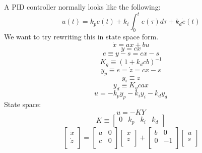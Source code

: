 \documentclass[10pt,letterpaper]{article}
\title{\doctitle}
\author{Garrett Wilson}
\begin{document}
\maketitle
A PID controller normally looks like the following:
\begin{equation}
u(t) = k_p e(t) + k_i \int_{0}^{t} e(\tau) d\tau + k_d \dot{e}(t)
\end{equation}
We want to try rewriting this in state space form.
\begin{equation}
\dot{x} = ax+bu
\end{equation}
\begin{equation}
y = cx
\end{equation}
\begin{equation}
e \equiv y - s = cx - s
\end{equation}
\begin{equation}
K_g \equiv ( 1 + k_d c b )^{-1}
\end{equation}
\begin{equation} \label{eq:y_p}
y_p \equiv e = \dot{z} = cx - s
\end{equation}
\begin{equation} \label{eq:y_i}
y_i \equiv z
\end{equation}
\begin{equation} \label{eq:y_d}
y_d \equiv K_g c a x
\end{equation}
\begin{equation} \label{eq:u}
u = -k_p y_p -k_i y_i - k_d y_d
\end{equation}
State space:
\begin{equation}
u = -K Y
\end{equation}
\begin{equation}
K \equiv
\begin{bmatrix}
	0 & k_p & k_i & k_d
\end{bmatrix}
\end{equation}
\begin{equation} \label{eq:complete_state}
\begin{bmatrix}
    \dot{x} \\
    \dot{z} \\
\end{bmatrix} =
\begin{bmatrix}
	a & 0 \\
	c & 0 \\
\end{bmatrix}
\begin{bmatrix}
	x \\
	z \\
\end{bmatrix} + 
\begin{bmatrix}
	b & 0 \\
	0 & -1 \\
\end{bmatrix}
\begin{bmatrix}
	u \\
	s \\
\end{bmatrix}
\end{equation}
\end{document}
